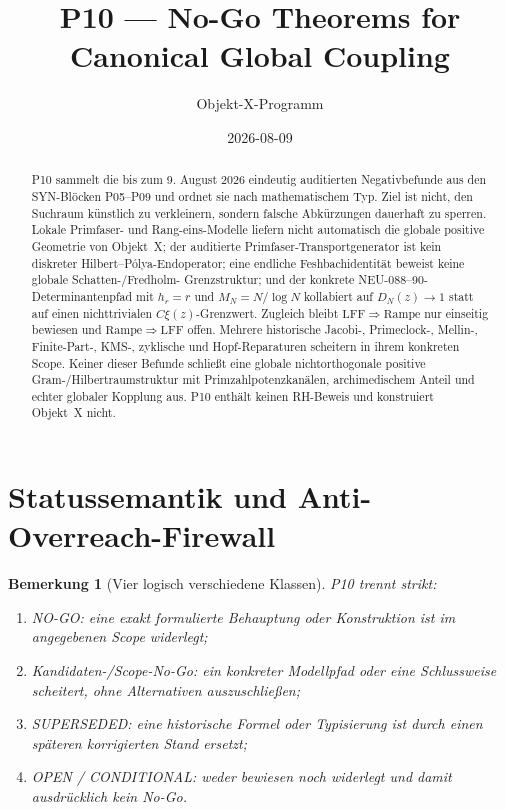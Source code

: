 \documentclass[11pt,a4paper]{amsart}
\title[P10 --- No-Go Theorems]{P10 --- No-Go Theorems for Canonical Global Coupling}
\author{Objekt-X-Programm}
\date{2026-08-09}
\newtheorem{remark}[theorem]{Bemerkung}
\newcommand{\LFF}{\mathrm{LFF}}
\begin{document}
\begin{abstract}
P10 sammelt die bis zum 9. August 2026 eindeutig auditierten Negativbefunde aus den
SYN-Blöcken P05--P09 und ordnet sie nach mathematischem Typ. Ziel ist nicht,
den Suchraum künstlich zu verkleinern, sondern falsche Abkürzungen dauerhaft
zu sperren. Lokale Primfaser- und Rang-eins-Modelle liefern nicht automatisch
die globale positive Geometrie von Objekt~X; der auditierte
Primfaser-Transportgenerator ist kein diskreter Hilbert--Pólya-Endoperator;
eine endliche Feshbachidentität beweist keine globale Schatten-/Fredholm-
Grenzstruktur; und der konkrete NEU-088--90-Determinantenpfad mit
$h_r=r$ und $M_N=N/\log N$ kollabiert auf $D_N(z)\to1$ statt auf einen
nichttrivialen $C\xi(z)$-Grenzwert. Zugleich bleibt
$\LFF\Rightarrow\mathrm{Rampe}$ nur einseitig bewiesen und
$\mathrm{Rampe}\Rightarrow\LFF$ offen. Mehrere historische Jacobi-,
Primeclock-, Mellin-, Finite-Part-, KMS-, zyklische und Hopf-Reparaturen
scheitern in ihrem konkreten Scope. Keiner dieser Befunde schließt eine
globale nichtorthogonale positive Gram-/Hilbertraumstruktur mit
Primzahlpotenzkanälen, archimedischem Anteil und echter globaler Kopplung aus.
P10 enthält keinen RH-Beweis und konstruiert Objekt~X nicht.
\end{abstract}

\maketitle

\section{Statussemantik und Anti-Overreach-Firewall}

\begin{remark}[Vier logisch verschiedene Klassen]\label{rem:status}
P10 trennt strikt:
\begin{enumerate}
  \item \emph{NO-GO}: eine exakt formulierte Behauptung oder Konstruktion ist
        im angegebenen Scope widerlegt;
  \item \emph{Kandidaten-/Scope-No-Go}: ein konkreter Modellpfad oder eine
        Schlussweise scheitert, ohne Alternativen auszuschließen;
  \item \emph{SUPERSEDED}: eine historische Formel oder Typisierung ist durch
        einen späteren korrigierten Stand ersetzt;
  \item \emph{OPEN / CONDITIONAL}: weder bewiesen noch widerlegt und damit
        ausdrücklich kein No-Go.
\end{enumerate}
\end{remark}
\end{document}
